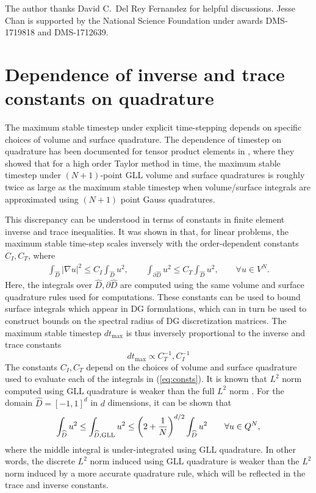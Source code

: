 \documentclass{svjour3}                     %
\renewcommand{\hat}{\widehat}
\newcommand{\LRp}[1]{\left( #1 \right)}
\newcommand{\LRb}[1]{\left| #1 \right|}
\newcommand{\Grad} {\ensuremath{\nabla}}
\begin{document}
The author thanks David C.\ Del Rey Fernandez for helpful discussions.  Jesse Chan is supported by the National Science Foundation under awards DMS-1719818 and DMS-1712639.  

\appendix
\section{Dependence of inverse and trace constants on quadrature}
\label{sec:consts}

The maximum stable timestep under explicit time-stepping depends on specific choices of volume and surface quadrature.  The dependence of timestep on quadrature has been documented for tensor product elements in \cite{gassner2011comparison}, where they showed that for a high order Taylor method in time, the maximum stable timestep under  $(N+1)$-point GLL volume and surface quadratures is roughly twice as large as the maximum stable timestep when volume/surface integrals are approximated using $(N+1)$ point Gauss quadratures.  

This discrepancy can be understood in terms of constants in finite element inverse and trace inequalities.  It was shown in \cite{chan2015gpu, chan2018multi} that, for linear problems, the maximum stable time-step scales inversely with the order-dependent constants $C_I, C_T$, where
\begin{align}
\int_{\hat{D}} \LRb{\Grad u}^2 \leq C_I \int_{\hat{D}} u^2, \qquad \int_{\partial \hat{D}} u^2 \leq C_T  \int_{\hat{D}} u^2, \qquad \forall u \in V^N \label{eq:consts}.
\end{align}
Here, the integrals over $\hat{D}, \partial \hat{D}$ are computed using the same volume and surface quadrature rules used for computations.  These constants can be used to bound surface integrals which appear in DG formulations, which can in turn be used to construct bounds on the spectral radius of DG discretization matrices.  The maximum stable timestep $dt_{\max}$ is thus inversely proportional to the inverse and trace constants
\[
dt_{\max} \propto C_T^{-1}, C_I^{-1}
\]
The constants $C_I, C_T$ depend on the choices of volume and surface quadrature used to evaluate each of the integrals in (\ref{eq:consts}).  It is known that $L^2$ norm computed using GLL quadrature is weaker than the full $L^2$ norm \cite{quarteroni1994introduction,canuto2007spectral}.  For the domain $\hat{D} = [-1,1]^d$ in $d$ dimensions, it can be shown that
\begin{equation}
\int_{\hat{D}} u^2 \leq \int_{\hat{D}, {\rm GLL}} u^2 \leq \LRp{2+\frac{1}{N}}^{d/2}\int_{\hat{D}} u^2 \qquad \forall u \in Q^{N},%
\label{eq:gllineq}
\end{equation}
where the middle integral is under-integrated using GLL quadrature.  In other words, the discrete $L^2$ norm induced using GLL quadrature is weaker than the $L^2$ norm induced by a more accurate quadrature rule, which will be reflected in the trace and inverse constants.  
\end{document}
